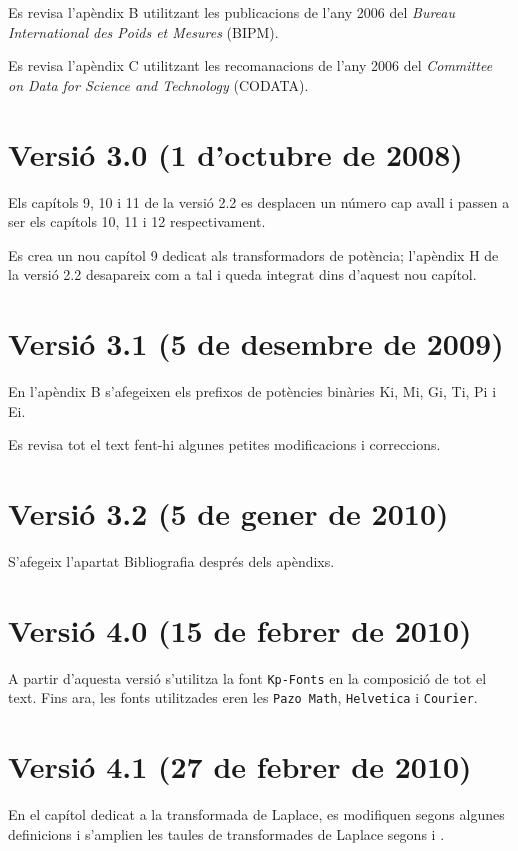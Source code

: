 Es revisa l'apèndix B utilitzant les publicacions de l'any 2006 del \textit{Bureau
International des Poids et Mesures} (BIPM).

Es revisa l'apèndix C utilitzant les recomanacions de l'any 2006 del \textit{Committee on Data for Science and Technology} (CODATA).

\section*{Versió 3.0 (1 d'octubre de 2008)}

Els capítols 9, 10 i 11 de la versió 2.2 es desplacen un número cap
avall i passen a ser els capítols 10, 11 i 12 respectivament.

Es crea un nou capítol 9 dedicat als transformadors de potència;
l'apèndix H de la versió 2.2 desapareix com a tal i queda integrat
dins d'aquest nou capítol.


\section*{Versió 3.1 (5 de desembre de 2009)}
En l'apèndix B s'afegeixen els prefixos de potències binàries Ki, Mi, Gi, Ti, Pi i Ei.

Es revisa tot el text fent-hi algunes petites modificacions i
correccions.

\section*{Versió 3.2 (5 de gener de 2010)}
S'afegeix l'apartat Bibliografia després dels apèndixs.


\section*{Versió 4.0 (15 de febrer de 2010)}
A partir d'aquesta versió s'utilitza la font \texttt{Kp-Fonts} en la composició de tot el text. Fins ara, les fonts utilitzades eren les \texttt{Pazo Math}, \texttt{Helvetica} i \texttt{Courier}.


\section*{Versió 4.1 (27 de febrer de 2010)}
En el capítol dedicat a la transformada de Laplace, es modifiquen segons \cite{SCH} algunes definicions  i s'amplien les taules de transformades de Laplace segons \cite{SCH} i \cite{RASd}.

